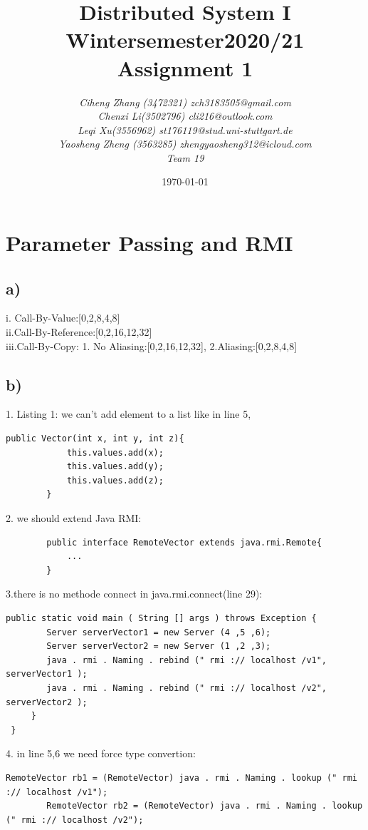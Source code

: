 \documentclass{article}
\begin{document}
\begin{titlepage}
    \title{\Huge \textbf{Distributed System I\\Wintersemester2020/21\\Assignment 1} }
    \author{\LARGE \textsl{Ciheng Zhang (3472321) zch3183505@gmail.com}\\\LARGE \textsl{Chenxi Li(3502796) cli216@outlook.com }\\\LARGE \textsl{Leqi Xu(3556962) st176119@stud.uni-stuttgart.de} \\\LARGE \textsl{Yaosheng Zheng (3563285) zhengyaosheng312@icloud.com}\\\LARGE \textsl{Team 19 } \\[200pt]}
    \date{\today}
    \maketitle
    \thispagestyle{empty}
\end{titlepage}
\newpage
\section{Parameter Passing and RMI}
\subsection*{a)}
      i. Call-By-Value:[0,2,8,4,8]
    \\ii.Call-By-Reference:[0,2,16,12,32]
    \\iii.Call-By-Copy: 1. No Aliasing:[0,2,16,12,32],  2.Aliasing:[0,2,8,4,8]
\subsection*{b)}
    1. Listing 1: we can't add element to a list like in line 5,
    \begin{lstlisting}[firstnumber=4]
        public Vector(int x, int y, int z){
            this.values.add(x);
            this.values.add(y);
            this.values.add(z);
        }
    \end{lstlisting}
    2. we should extend Java RMI:
    \begin{lstlisting}
        public interface RemoteVector extends java.rmi.Remote{
            ...
        }
    \end{lstlisting}
    3.there is no methode connect in java.rmi.connect(line 29):
\begin{lstlisting}[firstnumber=26]
    public static void main ( String [] args ) throws Exception {
        Server serverVector1 = new Server (4 ,5 ,6);
        Server serverVector2 = new Server (1 ,2 ,3);
        java . rmi . Naming . rebind (" rmi :// localhost /v1", serverVector1 );
        java . rmi . Naming . rebind (" rmi :// localhost /v2", serverVector2 );
     }
 }
\end{lstlisting}
    4. in line 5,6 we need force type convertion:
    \begin{lstlisting}[firstnumber=5]
        RemoteVector rb1 = (RemoteVector) java . rmi . Naming . lookup (" rmi :// localhost /v1");
        RemoteVector rb2 = (RemoteVector) java . rmi . Naming . lookup (" rmi :// localhost /v2");
    \end{lstlisting}
\end{document}
